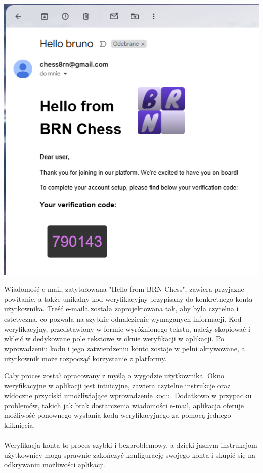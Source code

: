 \documentclass[12pt,a4paper]{article}
\begin{document}
\begin{minipage}[t]{0.45\textwidth} 
    \vspace{0pt} 
    \centering 
    \includegraphics[width=\linewidth]{images/ins_min_mail.png} 
\end{minipage} 
\hfill 
\begin{minipage}[t]{0.45\textwidth} 
    \vspace{0pt} 
    \raggedright 
    Wiadomość e-mail, zatytułowana "Hello from BRN Chess", zawiera przyjazne powitanie, a także unikalny kod weryfikacyjny przypisany do konkretnego konta użytkownika. Treść e-maila została zaprojektowana tak, aby była czytelna i estetyczna, co pozwala na szybkie odnalezienie wymaganych informacji. Kod weryfikacyjny, przedstawiony w formie wyróżnionego tekstu, należy skopiować i wkleić w dedykowane pole tekstowe w oknie weryfikacji w aplikacji. Po wprowadzeniu kodu i jego zatwierdzeniu konto zostaje w pełni aktywowane, a użytkownik może rozpocząć korzystanie z platformy. 
\end{minipage}

\vspace{1cm}

\noindent
Cały proces został opracowany z myślą o wygodzie użytkownika. Okno weryfikacyjne w aplikacji jest intuicyjne, zawiera czytelne instrukcje oraz widoczne przyciski umożliwiające wprowadzenie kodu. Dodatkowo w przypadku problemów, takich jak brak dostarczenia wiadomości e-mail, aplikacja oferuje możliwość ponownego wysłania kodu weryfikacyjnego za pomocą jednego kliknięcia.
\\\\
Weryfikacja konta to proces szybki i bezproblemowy, a dzięki jasnym instrukcjom użytkownicy mogą sprawnie zakończyć konfigurację swojego konta i skupić się na odkrywaniu możliwości aplikacji.
\end{document}
